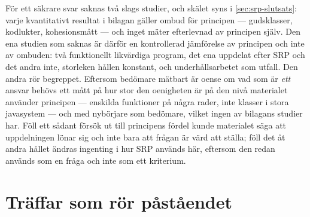 För ett säkrare svar saknas två slags studier, och skälet syns i
\cref{sec:srp-slutsats}: varje kvantitativt resultat i bilagan gäller
ombud för principen --- gudsklasser, kodlukter, kohesionsmått --- och
inget mäter efterlevnad av principen själv.  Den ena studien som saknas
är därför en kontrollerad jämförelse av principen och inte av ombuden:
två funktionellt likvärdiga program, det ena uppdelat efter SRP och det
andra inte, storleken hållen konstant, och underhållsarbetet som utfall.
Den andra rör begreppet.  Eftersom bedömare mätbart är oense om vad som
är \emph{ett} ansvar behövs ett mått på hur stor den oenigheten är på
den nivå materialet använder principen --- enskilda funktioner på några
rader, inte klasser i stora javasystem --- och med nybörjare som
bedömare, vilket ingen av bilagans studier har.  Föll ett sådant försök
ut till principens fördel kunde materialet säga att uppdelningen lönar
sig och inte bara att frågan är värd att ställa; föll det åt andra
hållet ändras ingenting i hur SRP används här, eftersom den redan
används som en fråga och inte som ett kriterium.

\section{Träffar som rör påståendet}
\label{sec:srp-traffar}

